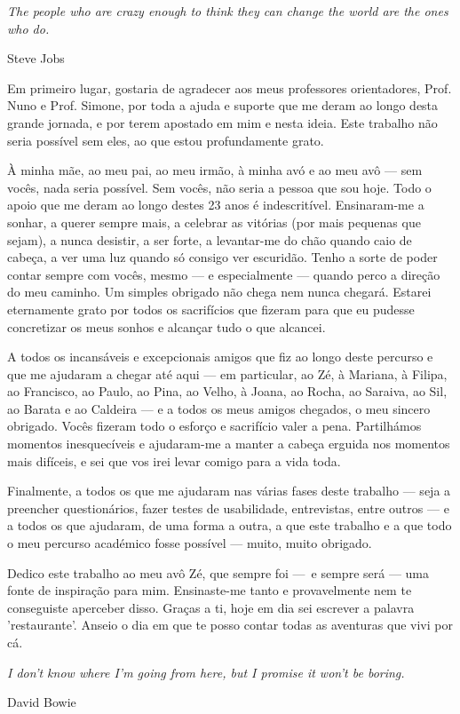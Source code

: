 
\epigraph{\textit{The people who are crazy enough to think they can change the world are the ones who do.}}{Steve Jobs}

\hfill \break

Em primeiro lugar, gostaria de agradecer aos meus professores orientadores, Prof. Nuno e Prof. Simone, por toda a ajuda e suporte que me deram ao longo desta grande jornada, e por terem apostado em mim e nesta ideia. Este trabalho não seria possível sem eles, ao que estou profundamente grato.

\hfill \break

À minha mãe, ao meu pai, ao meu irmão, à minha avó e ao meu avô — sem vocês, nada seria possível. Sem vocês, não seria a pessoa que sou hoje. Todo o apoio que me deram ao longo destes 23 anos é indescritível. Ensinaram-me a sonhar, a querer sempre mais, a celebrar as vitórias (por mais pequenas que sejam), a nunca desistir, a ser forte, a levantar-me do chão quando caio de cabeça, a ver uma luz quando só consigo ver escuridão. Tenho a sorte de poder contar sempre com vocês, mesmo — e especialmente — quando perco a direção do meu caminho. Um simples obrigado não chega nem nunca chegará. Estarei eternamente grato por todos os sacrifícios que fizeram para que eu pudesse concretizar os meus sonhos e alcançar tudo o que alcancei. 

\hfill \break

A todos os incansáveis e excepcionais amigos que fiz ao longo deste percurso e que me ajudaram a chegar até aqui — em particular, ao Zé, à Mariana, à Filipa, ao Francisco, ao Paulo, ao Pina, ao Velho, à Joana, ao Rocha, ao Saraiva, ao Sil, ao Barata e ao Caldeira — e a todos os meus amigos chegados, o meu sincero obrigado. Vocês fizeram todo o esforço e sacrifício valer a pena. Partilhámos momentos inesquecíveis e ajudaram-me a manter a cabeça erguida nos momentos mais difíceis, e sei que vos irei levar comigo para a vida toda.

\hfill \break

Finalmente, a todos os que me ajudaram nas várias fases deste trabalho — seja a preencher questionários, fazer testes de usabilidade, entrevistas, entre outros — e a todos os que ajudaram, de uma forma a outra, a que este trabalho e a que todo o meu percurso académico fosse possível — muito, muito obrigado.

\hfill \break

Dedico este trabalho ao meu avô Zé, que sempre foi — e sempre será — uma fonte de inspiração para mim. Ensinaste-me tanto e provavelmente nem te conseguiste aperceber disso. Graças a ti, hoje em dia sei escrever a palavra 'restaurante'. Anseio o dia em que te posso contar todas as aventuras que vivi por cá.

\hfill \break


\epigraph{\textit{I don't know where I'm going from here, but I promise it won't be boring.}}{David Bowie}